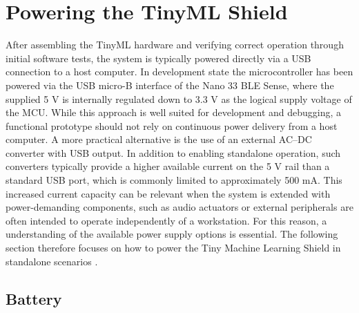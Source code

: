 %
%




    
\chapter{Powering the TinyML Shield}

After assembling the TinyML hardware and verifying correct operation through initial software tests, the system is typically powered directly via a USB connection to a host computer. In development state the microcontroller has been powered via the USB micro-B interface of the Nano 33 BLE Sense, where the supplied 5 V is internally regulated down to 3.3 V as the logical supply voltage of the MCU. While this approach is well suited for development and debugging, a functional prototype should not rely on continuous power delivery from a host computer. A more practical alternative is the use of an external AC–DC converter with USB output. In addition to enabling standalone operation, such converters typically provide a higher available current on the 5 V rail than a standard USB port, which is commonly limited to approximately 500 mA. This increased current capacity can be relevant when the system is extended with power-demanding components, such as audio actuators or external peripherals are often intended to operate independently of a workstation. For this reason, a  understanding of the available power supply options is essential. The following section therefore focuses on how to power the Tiny Machine Learning Shield in standalone scenarios \cite{ICTP:2022}.


\section{Battery}

